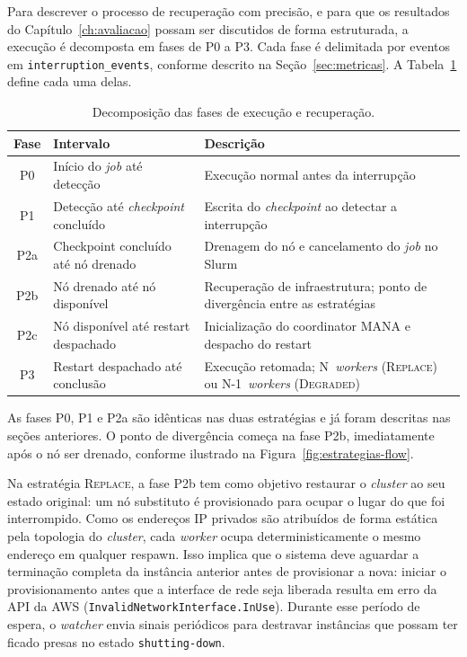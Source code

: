 Para descrever o processo de recuperação com precisão, e para que os resultados do
Capítulo~\ref{ch:avaliacao} possam ser discutidos de forma estruturada, a execução é
decomposta em fases de P0 a P3. Cada fase é delimitada por eventos em
\texttt{interruption\_events}, conforme descrito na Seção~\ref{sec:metricas}. A
Tabela~\ref{tab:fases-recuperacao} define cada uma delas.

\begin{table}[htb]
  \caption{Decomposição das fases de execução e recuperação.}
  \label{tab:fases-recuperacao}
  \begin{tabular}{c l p{6.8cm}}
    \toprule
    Fase & Intervalo & Descrição \\
    \midrule
    P0 & Início do \textit{job} até detecção & Execução normal antes da interrupção \\
    P1 & Detecção até \textit{checkpoint} concluído & Escrita do \textit{checkpoint} ao detectar a interrupção \\
    P2a & Checkpoint concluído até nó drenado & Drenagem do nó e cancelamento do \textit{job} no Slurm \\
    P2b & Nó drenado até nó disponível & Recuperação de infraestrutura; ponto de divergência entre as estratégias \\
    P2c & Nó disponível até restart despachado & Inicialização do coordinator MANA e despacho do restart \\
    P3 & Restart despachado até conclusão & Execução retomada; N~\textit{workers} (\textsc{Replace}) ou N{-}1~\textit{workers} (\textsc{Degraded}) \\
    \bottomrule
  \end{tabular}
\end{table}

As fases P0, P1 e P2a são idênticas nas duas estratégias e já foram descritas nas
seções anteriores. O ponto de divergência começa na fase P2b, imediatamente após
o nó ser drenado, conforme ilustrado na Figura~\ref{fig:estrategias-flow}.

Na estratégia \textsc{Replace}, a fase P2b tem como objetivo restaurar o \textit{cluster} ao seu estado
original: um nó substituto é provisionado para ocupar o lugar do que foi interrompido.
Como os endereços IP privados são atribuídos de forma estática pela topologia do
\textit{cluster}, cada \textit{worker} ocupa deterministicamente o mesmo endereço em qualquer respawn.
Isso implica que o sistema deve aguardar a terminação completa da instância anterior
antes de provisionar a nova: iniciar o provisionamento antes que a interface de rede
seja liberada resulta em erro da \gls{API} da \gls{AWS}
(\texttt{InvalidNetworkInterface.InUse}). Durante esse período de espera, o \textit{watcher}
envia sinais periódicos para destravar instâncias que possam ter ficado presas no
estado \texttt{shutting-down}.

